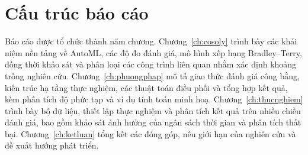 \section{Cấu trúc báo cáo}
\label{sec:bocuc}
Báo cáo được tổ chức thành năm chương.
Chương~\ref{ch:cosoly} trình bày các khái niệm nền tảng về AutoML, các độ đo đánh
giá, mô hình xếp hạng Bradley--Terry, đồng thời khảo sát và phân loại các công
trình liên quan nhằm xác định khoảng trống nghiên cứu.
Chương~\ref{ch:phuongphap} mô tả giao thức đánh giá công bằng, kiến trúc hạ tầng
thực nghiệm, các thuật toán điều phối và tổng hợp kết quả, kèm phân tích độ phức
tạp và ví dụ tính toán minh hoạ.
Chương~\ref{ch:thucnghiem} trình bày bộ dữ liệu, thiết lập thực nghiệm và phân
tích kết quả trên nhiều chiều đánh giá, bao gồm khảo sát ảnh hưởng của ngân sách
thời gian và phân tích thất bại.
Chương~\ref{ch:ketluan} tổng kết các đóng góp, nêu giới hạn của nghiên cứu và đề
xuất hướng phát triển.
